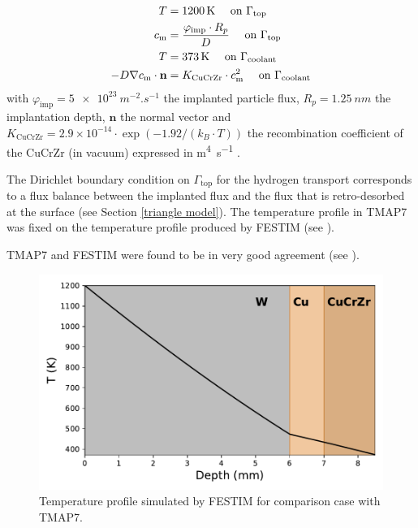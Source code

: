 \begin{subequations}
    \begin{align}
    T &= \SI{1200}{K}\quad \text { on } \Gamma_\mathrm{top}\\
    c_\mathrm{m} &=  \frac{\varphi_\mathrm{imp} \cdot R_p}{D} \quad \text { on } \Gamma_\mathrm{top}\\
    T &= \SI{373}{K} \quad \text { on } \Gamma_\mathrm{coolant}\\
    -D \nabla c_\mathrm{m} \cdot \mathbf{n} &= K_\mathrm{CuCrZr} \cdot c_\mathrm{m}^{2} \quad \text { on } \Gamma_\mathrm{coolant}  
    \end{align}
    \labeq{code comparison BCs}
\end{subequations}
with $\varphi_\mathrm{imp} = \SI{5e23}{m^{-2}.s^{-1}}$ the implanted particle flux, $R_p = \SI{1.25}{nm}$ the implantation depth, $\mathbf{n}$ the normal vector and $K_\mathrm{CuCrZr} = 2.9 \times 10^{-14}\cdot \exp{(-1.92/(k_B\cdot T))}$ the recombination coefficient of the CuCrZr (in vacuum) expressed in \si{m^4.s^{-1}} .

The Dirichlet boundary condition on $\Gamma_\mathrm{top}$ for the hydrogen transport corresponds to a flux balance between the implanted flux and the flux that is retro-desorbed at the surface (see Section \ref{triangle model}).
The temperature profile in TMAP7 was fixed on the temperature profile produced by FESTIM (see ).

TMAP7 and FESTIM were found to be in very good agreement (see ).

\begin{figure} [h]
    \centering
    \includegraphics[width=0.5\linewidth]{Figures/Chapter3/monoblocks/interface_condition/iter case/temperature_1D.pdf}
    \caption{Temperature profile simulated by FESTIM for comparison case with TMAP7.}
\end{figure}

